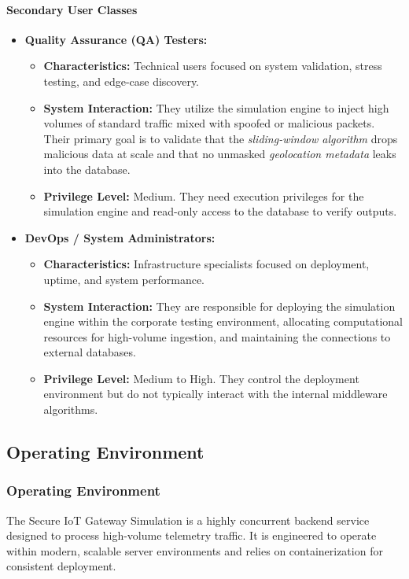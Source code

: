 \documentclass[12pt,letterpaper]{article}
\begin{document}
\paragraph{Secondary User Classes}
\begin{itemize}
\item \textbf{Quality Assurance (QA) Testers:}
\begin{itemize}
\item \textbf{Characteristics:} Technical users focused on system validation, stress testing, and edge-case discovery.
\item \textbf{System Interaction:} They utilize the simulation engine to inject high volumes of standard traffic mixed with spoofed or malicious packets. Their primary goal is to validate that the \emph{sliding-window algorithm} drops malicious data at scale and that no unmasked \emph{geolocation metadata} leaks into the database.
\item \textbf{Privilege Level:} Medium. They need execution privileges for the simulation engine and read-only access to the database to verify outputs.
\end{itemize}
\item \textbf{DevOps / System Administrators:}
\begin{itemize}
\item \textbf{Characteristics:} Infrastructure specialists focused on deployment, uptime, and system performance.
\item \textbf{System Interaction:} They are responsible for deploying the simulation engine within the corporate testing environment, allocating computational resources for high-volume ingestion, and maintaining the connections to external databases.
\item \textbf{Privilege Level:} Medium to High. They control the deployment environment but do not typically interact with the internal middleware algorithms.
\end{itemize}
\end{itemize}
\vspace{0.08in}
\subsection{Operating Environment}
\subsubsection{Operating Environment}
The Secure IoT Gateway Simulation is a highly concurrent backend service designed to process high-volume telemetry traffic. It is engineered to operate within modern, scalable server environments and relies on containerization for consistent deployment.\par
\end{document}
